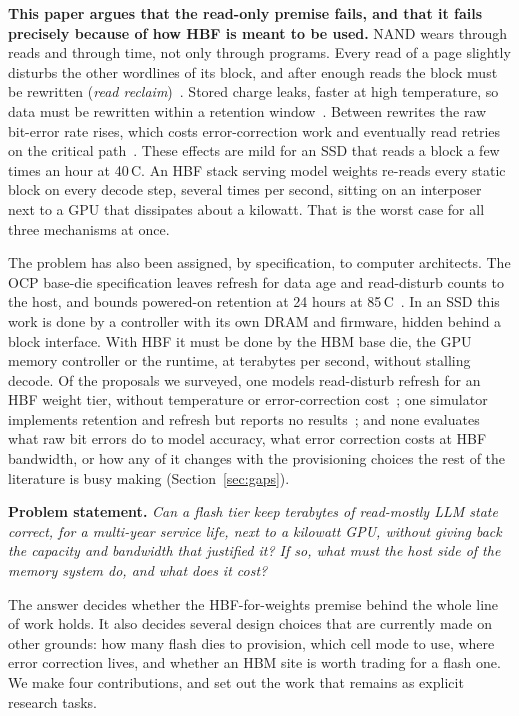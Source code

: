 \documentclass[conference,10pt]{IEEEtran}
\begin{document}
\textbf{This paper argues that the read-only premise fails, and that it fails
precisely because of how HBF is meant to be used.} NAND wears through reads and
through time, not only through programs. Every read of a page slightly disturbs
the other wordlines of its block, and after enough reads the block must be
rewritten (\emph{read reclaim})~\cite{cai2015readdisturb}. Stored charge leaks,
faster at high temperature, so data must be rewritten within a retention
window~\cite{cai2017errors,luo2018heatwatch}. Between rewrites the raw bit-error
rate rises, which costs error-correction work and eventually read retries on the
critical path~\cite{cai2017errors}. These effects are mild for an SSD that
reads a block a few times an hour at 40\,\textdegree{}C. An HBF stack serving model weights
re-reads every static block on every decode step, several times per second,
sitting on an interposer next to a GPU that dissipates about a kilowatt. That is
the worst case for all three mechanisms at once.

The problem has also been assigned, by specification, to computer architects.
The OCP base-die specification leaves refresh for data age and read-disturb
counts to the host, and bounds powered-on retention at 24 hours at
85\,\textdegree{}C~\cite{ocp2026hbf,li2026hbfsucks,hu2026hbfsim}. In an SSD this work is done
by a controller with its own DRAM and firmware, hidden behind a block interface.
With HBF it must be done by the HBM base die, the GPU memory controller or the
runtime, at terabytes per second, without stalling decode. Of the proposals we
surveyed, one models read-disturb refresh for an HBF weight tier, without
temperature or error-correction cost~\cite{oliveira2026flint}; one simulator
implements retention and refresh but reports no results~\cite{hu2026hbfsim}; and
none evaluates what raw bit errors do to model accuracy, what error correction
costs at HBF bandwidth, or how any of it changes with the provisioning choices
the rest of the literature is busy making (Section~\ref{sec:gaps}).

\textbf{Problem statement.} \emph{Can a flash tier keep terabytes of read-mostly
LLM state correct, for a multi-year service life, next to a kilowatt GPU,
without giving back the capacity and bandwidth that justified it? If so, what
must the host side of the memory system do, and what does it cost?}

The answer decides whether the HBF-for-weights premise behind the whole line of
work holds. It also decides several design choices that are currently made on
other grounds: how many flash dies to provision, which cell mode to use, where
error correction lives, and whether an HBM site is worth trading for a flash
one. We make four contributions, and set out the work that remains as explicit
research tasks.
\end{document}
